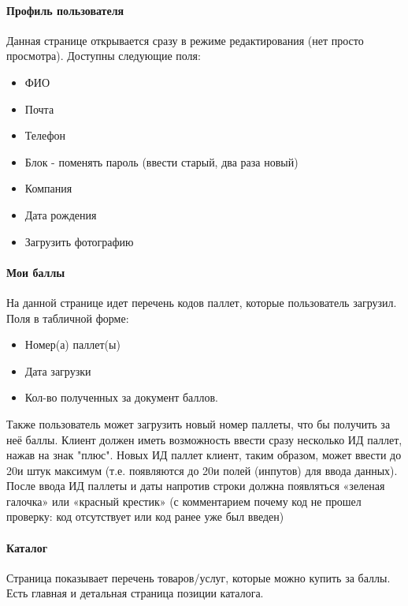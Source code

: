 \documentclass[DIV=calc, paper=a4, fontsize=11pt]{scrartcl} %
\begin{document}
\paragraph{Профиль пользователя}

Данная странице открывается сразу в режиме редактирования (нет просто просмотра). Доступны следующие поля:

\begin{itemize}
	\item ФИО
	\item Почта
	\item Телефон
	\item Блок - поменять пароль (ввести старый, два раза новый)
	\item Компания
	\item Дата рождения
	\item Загрузить фотографию
\end{itemize}

\paragraph{Мои баллы}

На данной странице идет перечень кодов паллет, которые пользователь загрузил. Поля в табличной форме:

\begin{itemize}
	\item Номер(а) паллет(ы)
	\item Дата загрузки
	\item Кол-во полученных за документ баллов.
\end{itemize}

Также пользователь может загрузить новый номер паллеты, что бы получить за неё баллы. Клиент должен иметь возможность ввести сразу несколько ИД паллет, нажав на знак "плюс". Новых ИД паллет клиент, таким образом, может ввести до 20и штук максимум (т.е. появляются до 20и полей (инпутов) для ввода данных).
\\[0.5cm]
После ввода ИД паллеты и даты напротив строки должна появляться «зеленая галочка» или «красный крестик» (с комментарием почему код не прошел проверку: код отсутствует или код ранее уже был введен)

\paragraph{Каталог}

Страница показывает перечень товаров/услуг, которые можно купить за баллы. Есть главная и детальная страница позиции каталога.
\end{document}
